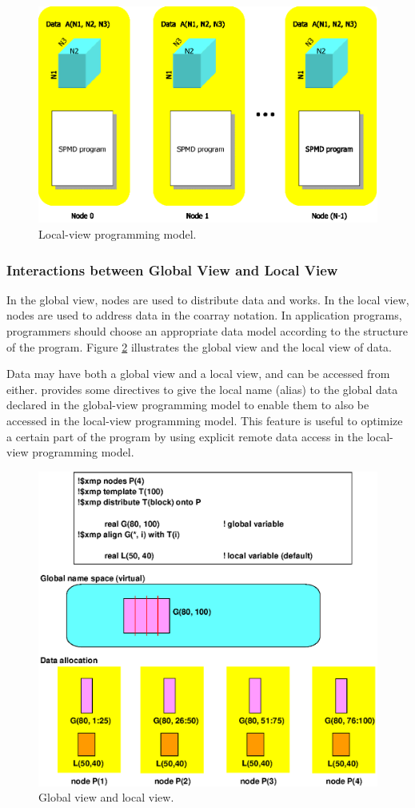 \begin{figure}
  \centering
  \includegraphics[width=12cm]{figs/Fig3.eps}
  \caption{Local-view programming model.}
\label{fig3}
\end{figure}


\subsubsection{Interactions between Global View and Local View}

In the global view, nodes are used to distribute data and works. In the
local view, nodes are used to address data in the coarray notation.
%
In application programs,
programmers should choose an appropriate data model according to the
structure of the program. Figure \ref{fig4} illustrates the global view
and the local view of data.

Data may have both a global view and a local view, and can be accessed
from either. {\XMP} provides some directives to give the local name
(alias) to the global data declared in the global-view programming model
to enable them to also be accessed in the local-view programming
model. This feature is useful to optimize a certain part of the program
by using explicit remote data access in the local-view programming
model.

\begin{figure}
  \centering
  \includegraphics[width=12cm]{figs/Fig4.eps}
  \caption{Global view and local view.}
\label{fig4}
\end{figure}


